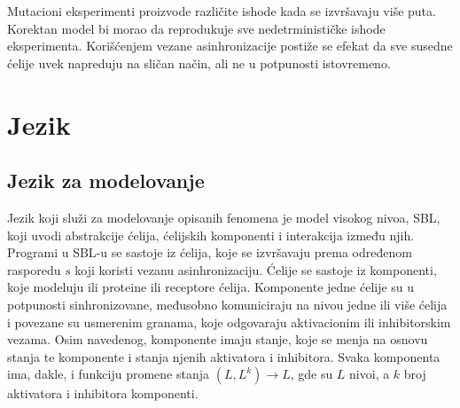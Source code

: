 \documentclass[a4paper]{article}
\begin{document}
Mutacioni eksperimenti proizvode različite ishode kada se izvršavaju više puta. Korektan model bi morao da reprodukuje sve nedetrminističke ishode eksperimenta. Korišćenjem vezane asinhronizacije postiže se efekat da sve susedne ćelije uvek napreduju na sličan način, ali ne u potpunosti istovremeno. 

\section{Jezik}
\subsection{Jezik za modelovanje}
Jezik koji služi za modelovanje opisanih fenomena je model visokog nivoa, SBL, koji uvodi abstrakcije ćelija, ćelijskih komponenti i interakcija između njih. \\
Programi u SBL-u se sastoje iz ćelija, koje se izvršavaju prema određenom rasporedu $s$ koji koristi vezanu asinhronizaciju. Ćelije se sastoje iz komponenti, koje modeluju ili proteine ili receptore ćelija. Komponente jedne ćelije su u potpunosti sinhronizovane, međusobno komuniciraju na nivou jedne ili više ćelija i povezane su usmerenim granama, koje odgovaraju aktivacionim ili inhibitorskim vezama. Osim navedenog, komponente imaju stanje, koje se menja na osnovu stanja te komponente i stanja njenih aktivatora i inhibitora. Svaka komponenta ima, dakle, i funkciju promene stanja $(L, L^k) \longrightarrow L$, gde su $L$ nivoi, a $k$ broj aktivatora i inhibitora komponenti. 
\end{document}
